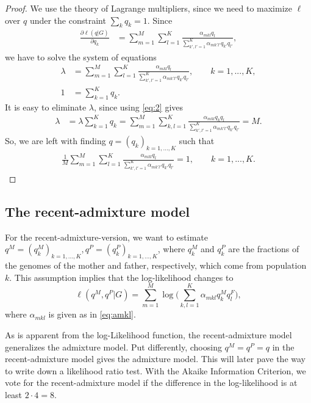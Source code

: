 \documentclass[12pt]{article}
\theoremstyle{definition}
\begin{document}
\begin{proof}
  We use the theory of Lagrange multipliers, since we need to maximize
  $\ell$ over $q$ under the constraint $\sum_k q_k=1$.
  Since
  \begin{align*}
    \frac{\partial \ell(q|G)}{\partial q_k} & = \sum_{m=1}^M \sum_{l=1}^K \frac{\alpha_{mkl}q_l}{\sum_{k',l'=1}^K
                                              \alpha_{mk'l'}q_{k'}q_{l'}},
  \end{align*}
  we have to solve the system of equations
  \begin{align}\label{eq:1}
    \lambda & = \sum_{m=1}^M \sum_{l=1}^K \frac{\alpha_{mkl}q_l}{\sum_{k',l'=1}^K \alpha_{mk'l'}q_{k'}q_{l'}}, \qquad k=1,...,K,
    \\\label{eq:2}
    1 & = \sum_{k=1}^K q_k.
  \end{align}
  It is easy to eliminate $\lambda$, since using \eqref{eq:2} gives
  \begin{align*}
    \lambda & = \lambda \sum_{k=1}^K q_k = \sum_{m=1}^M \sum_{k,l=1}^K
              \frac{\alpha_{mkl}q_kq_l}{\sum_{k',l'=1}^K \alpha_{mk'l'}q_{k'}q_{l'}} = M.
  \end{align*}
  So, we are left with finding $q = (q_k)_{k=1,...,K}$ such that
  \begin{align}\label{eq:1}
    \frac{1}{M}\sum_{m=1}^M \sum_{l=1}^K \frac{\alpha_{mkl}q_l}{\sum_{k',l'=1}^K \alpha_{mk'l'}q_{k'}q_{l'}} = 1, \qquad k=1,...,K.
  \end{align}
\end{proof}


\subsection{The recent-admixture model}
\noindent
For the recent-admixture-version, we want to estimate
$q^M=(q^M_{k})_{k=1,...,K}, q^P=(q^P_{k})_{k=1,...,K}$, where
$q^M_{k}$ and $q^P_k$ are the fractions of the genomes of the mother
and father, respectively, which come from population $k$.  This
assumption implies that the log-likelihood changes to
$$ \ell(q^M, q^P|G) = \sum_{m=1}^M  \log\Big(\sum_{k,l=1}^K \alpha_{mkl}q_{k}^M q_l^F\Big),$$
where $\alpha_{mkl}$ is given as in \eqref{eq:amkl}.

As is apparent from the log-Likelihood function, the recent-admixture
model generalizes the admixture model. Put differently, choosing
$q^M = q^P = q$ in the recent-admixture model gives the admixture
model. This will later pave the way to write down a likelihood ratio
test. With the Akaike Information Criterion, we vote for the
recent-admixture model if the difference in the log-likelihood is at
least $2\cdot 4 = 8.$
\end{document}
